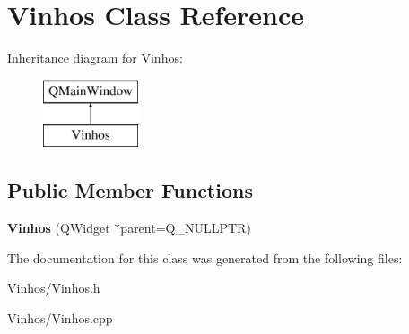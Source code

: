 \hypertarget{class_vinhos}{}\section{Vinhos Class Reference}
\label{class_vinhos}
Inheritance diagram for Vinhos\+:\begin{figure}[H]
\begin{center}
\leavevmode
\includegraphics[height=2.000000cm]{class_vinhos}
\end{center}
\end{figure}
\subsection*{Public Member Functions}
\begin{DoxyCompactItemize}
\item 
\mbox{\label{class_vinhos_ad12ae5857e2aac003b7f95e89fba5250}} 
{\bfseries Vinhos} (Q\+Widget $\ast$parent=Q\+\_\+\+N\+U\+L\+L\+P\+TR)
\end{DoxyCompactItemize}


The documentation for this class was generated from the following files\+:\begin{DoxyCompactItemize}
\item 
Vinhos/Vinhos.\+h\item 
Vinhos/Vinhos.\+cpp\end{DoxyCompactItemize}

